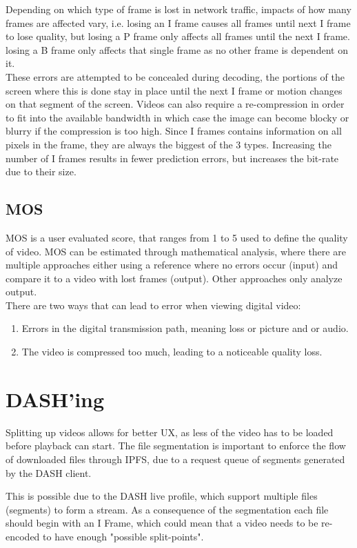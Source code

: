Depending on which type of frame is lost in network traffic, impacts of how many frames are affected vary, i.e. losing an I frame causes all frames until next I frame to lose quality, but losing a P frame only affects all frames until the next I frame. losing a B frame only affects that single frame as no other frame is dependent on it.\\
These errors are attempted to be concealed during decoding, the portions of the screen where this is done stay in place until the next I frame or motion changes on that segment of the screen. Videos can also require a re-compression in order to fit into the available bandwidth in which case the image can become blocky or blurry if the compression is too high.
Since I frames contains information on all pixels in the frame, they are always the biggest of the 3 types. Increasing the number of I frames results in fewer prediction errors, but increases the bit-rate due to their size.


\subsection{\acl{MOS}}
\ac{MOS} is a user evaluated score, that ranges from 1 to 5 used to define the quality of video. \ac{MOS} can be estimated through mathematical analysis, where there are multiple approaches either using a reference where no errors occur (input) and compare it to a video with lost frames (output). Other approaches only analyze output.\\
There are two ways that can lead to error when viewing digital video:
\begin{enumerate}
    \item Errors in the digital transmission path, meaning loss or picture and or audio.
    \item The video is compressed too much, leading to a noticeable quality loss.
\end{enumerate}


\section{DASH'ing}
\label{sec:des-dash}
Splitting up videos allows for better \ac{UX}, as less of the video has to be loaded before playback can start. The file segmentation is important to enforce the flow of downloaded files through IPFS, due to a request queue of segments generated by the \ac{DASH} client.

This is possible due to the \ac{DASH} live profile, which support multiple files (segments) to form a stream. As a consequence of the segmentation each file should begin with an I Frame, which could mean that a video needs to be re-encoded to have enough "possible split-points".

